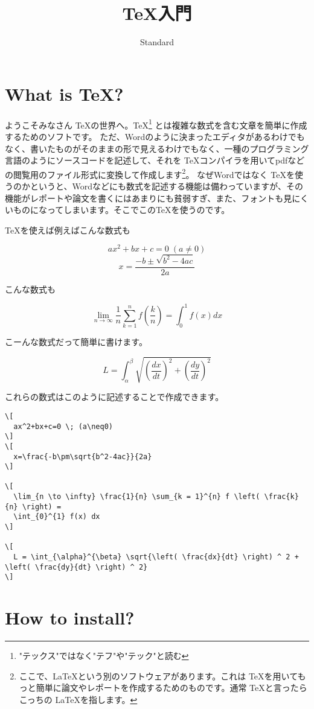 \documentclass[paper=b5j]{jlreq}
\begin{document}
\title{\TeX 入門}
\author{Standard}
\maketitle

\section{What is \TeX ?}

ようこそみなさん \TeX の世界へ。\TeX \footnote{"テックス"ではなく"テフ"や"テック"と読む} とは複雑な数式を含む文章を簡単に作成するためのソフトです。
ただ、Wordのように決まったエディタがあるわけでもなく、書いたものがそのままの形で見えるわけでもなく、一種のプログラミング言語のようにソースコードを記述して、それを \TeX コンパイラを用いてpdfなどの閲覧用のファイル形式に変換して作成します\footnote{ここで、\LaTeX という別のソフトウェアがあります。これは \TeX を用いてもっと簡単に論文やレポートを作成するためのものです。通常 \TeX と言ったらこっちの \LaTeX を指します。}。
なぜWordではなく \TeX を使うのかというと、Wordなどにも数式を記述する機能は備わっていますが、その機能がレポートや論文を書くにはあまりにも貧弱すぎ、また、フォントも見にくいものになってしまいます。そこでこの\TeX を使うのです。

\TeX を使えば例えばこんな数式も

\[
  ax^2+bx+c=0 \; (a\neq0)
\]
\[
  x=\frac{-b\pm\sqrt{b^2-4ac}}{2a}
\]

こんな数式も

\[
  \lim_{n \to \infty} \frac{1}{n} \sum_{k = 1}^{n} f \left( \frac{k}{n} \right) =
  \int_{0}^{1} f(x) dx
\]

こーんな数式だって簡単に書けます。

\[
  L = \int_{\alpha}^{\beta} \sqrt{\left( \frac{dx}{dt} \right) ^ 2 + \left( \frac{dy}{dt} \right) ^ 2}
\]

これらの数式はこのように記述することで作成できます。

\begin{lstlisting}
\[
  ax^2+bx+c=0 \; (a\neq0)
\]
\[
  x=\frac{-b\pm\sqrt{b^2-4ac}}{2a}
\]

\[
  \lim_{n \to \infty} \frac{1}{n} \sum_{k = 1}^{n} f \left( \frac{k}{n} \right) =
  \int_{0}^{1} f(x) dx
\]

\[
  L = \int_{\alpha}^{\beta} \sqrt{\left( \frac{dx}{dt} \right) ^ 2 + \left( \frac{dy}{dt} \right) ^ 2}
\]
\end{lstlisting}

\section{How to install?}
\end{document}
